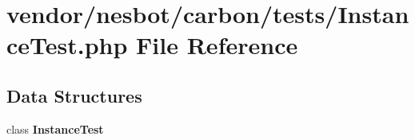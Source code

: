 \section{vendor/nesbot/carbon/tests/\+Instance\+Test.php File Reference}
\label{_instance_test_8php}
\subsection*{Data Structures}
\begin{DoxyCompactItemize}
\item 
class {\bf Instance\+Test}
\end{DoxyCompactItemize}
